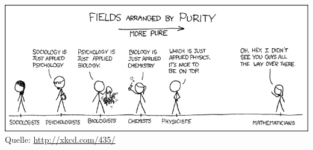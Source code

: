 \documentclass[a4paper,ngerman,landscape]{scrartcl}
\begin{document}
\begin{center}
  \includegraphics[scale=0.8]{purity.png} \\[2em]

  Quelle: \url{http://xkcd.com/435/}
\end{center}
\end{document}
